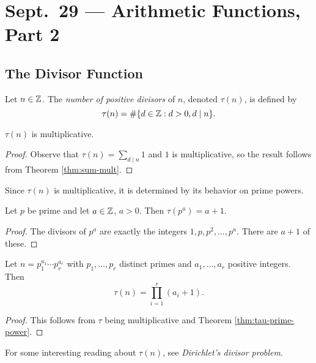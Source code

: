 \chapter{Sept.~29 --- Arithmetic Functions, Part 2}

\section{The Divisor Function}

\begin{definition}
  Let $n \in \mathbb{Z}$. The \emph{number of
  positive divisors} of $n$, denoted
  $\tau(n)$, is defined by
  \[
    \tau(n) =
    \#\{d \in \mathbb{Z} : d > 0, d \mid n\}.
  \]
\end{definition}

\begin{theorem}
  $\tau(n)$ is multiplicative.
\end{theorem}

\begin{proof}
  Observe that
  $\tau(n) = \sum_{d \mid n} 1$ and
  $1$ is multiplicative, so
  the result follows from
  Theorem \ref{thm:sum-mult}.
\end{proof}

\begin{remark}
  Since $\tau(n)$ is multiplicative,
  it is determined by its behavior on
  prime powers.
\end{remark}

\begin{theorem}\label{thm:tau-prime-power}
  Let $p$ be prime and let
  $a \in \mathbb{Z}$, $a > 0$. Then
  $\tau(p^a) = a + 1$.
\end{theorem}

\begin{proof}
  The divisors of $p^a$ are
  exactly the integers
  $1, p, p^2, \dots, p^a$. There
  are $a + 1$ of these.
\end{proof}

\begin{theorem}
  Let $n = p_1^{a_1} \cdots p_r^{a_r}$
  with $p_1, \dots, p_r$ distinct
  primes and $a_1, \dots, a_r$ positive
  integers. Then
  \[
    \tau(n) = \prod_{i = 1}^r (a_i + 1).
  \]
\end{theorem}

\begin{proof}
  This follows from
  $\tau$ being multiplicative and
  Theorem \ref{thm:tau-prime-power}.
\end{proof}

\begin{remark}
  For some interesting reading about $\tau(n)$,
  see \emph{Dirichlet's
  divisor problem}.
\end{remark}

